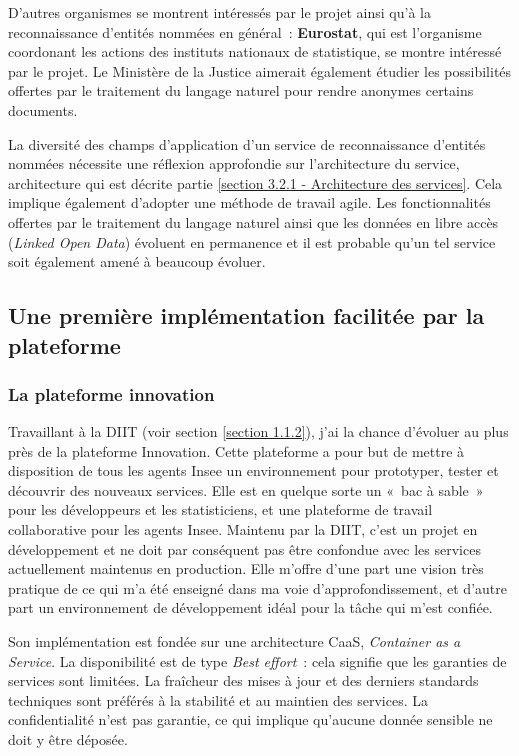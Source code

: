 D'autres organismes se montrent intéressés par le projet ainsi qu'à la reconnaissance d'entités nommées en général~: \textbf{Eurostat}, qui est l'organisme coordonant les actions des instituts nationaux de statistique, se montre intéressé par le projet. Le Ministère de la Justice aimerait également étudier les possibilités offertes par le traitement du langage naturel pour rendre anonymes certains documents.
\newline

La diversité des champs d'application d'un service de reconnaissance d'entités nommées nécessite une réflexion approfondie sur l'architecture du service, architecture qui est décrite partie \ref{section 3.2.1 - Architecture des services}. Cela implique également d'adopter une méthode de travail agile. Les fonctionnalités offertes par le traitement du langage naturel ainsi que les données en libre accès (\textit{Linked Open Data}) évoluent en permanence et il est probable qu'un tel service soit également amené à beaucoup évoluer.
\label{section 2.1.4}

\subsection{Une première implémentation facilitée par la plateforme}

\subsubsection{La plateforme innovation}
Travaillant à la DIIT (voir section \ref{section 1.1.2}), j'ai la chance d'évoluer au plus près de la plateforme Innovation. Cette plateforme a pour but de mettre à disposition de tous les agents Insee un environnement pour prototyper, tester et découvrir des nouveaux services. Elle est en quelque sorte un «~bac à sable~» pour les développeurs et les statisticiens, et une plateforme de travail collaborative pour les agents Insee. Maintenu par la DIIT, c'est un projet en développement et ne doit par conséquent pas être confondue avec les services actuellement maintenus en production. Elle m'offre d'une part une vision très pratique de ce qui m'a été enseigné dans ma voie d'approfondissement, et d'autre part un environnement de développement idéal pour la tâche qui m'est confiée.
\newline

Son implémentation est fondée sur une architecture CaaS, \textit{Container as a Service}. La disponibilité est de type \textit{Best effort}~: cela signifie que les garanties de services sont limitées. La fraîcheur des mises à jour et des derniers standards techniques sont préférés à la stabilité et au maintien des services. La confidentialité n'est pas garantie, ce qui implique qu'aucune donnée sensible ne doit y être déposée.
\newline

